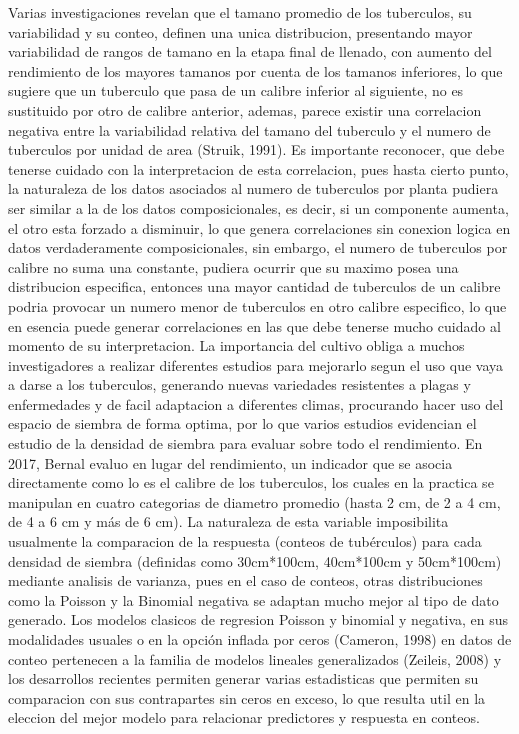 Varias investigaciones revelan que el tamano promedio de los tuberculos, su variabilidad y su conteo, definen una unica distribucion, presentando mayor variabilidad de rangos de tamano en la etapa final de llenado, con aumento del rendimiento de los mayores tamanos por cuenta de los tamanos inferiores, lo que sugiere que un tuberculo que pasa de un calibre inferior al siguiente, no es sustituido por otro de calibre anterior, ademas, parece existir una correlacion negativa entre la variabilidad relativa del tamano del tuberculo y el numero de tuberculos por unidad de area (Struik, 1991). Es importante reconocer, que debe tenerse cuidado con la interpretacion de esta correlacion, pues hasta cierto punto, la naturaleza de los datos asociados al numero de tuberculos por planta pudiera ser similar a la de los datos composicionales, es decir, si un componente aumenta, el otro esta forzado a disminuir, lo que genera correlaciones sin conexion logica en datos verdaderamente composicionales, sin embargo, el numero de tuberculos por calibre no suma una constante, pudiera ocurrir que su maximo posea una distribucion especifica, entonces una mayor cantidad de tuberculos de un calibre podria provocar un numero menor de tuberculos en otro calibre especifico, lo que en esencia puede generar correlaciones en las que debe tenerse mucho cuidado al momento de su interpretacion. La importancia del cultivo obliga a muchos investigadores a realizar diferentes estudios para mejorarlo segun el uso que vaya a darse a los tuberculos, generando nuevas variedades resistentes a plagas y enfermedades y de facil adaptacion a diferentes climas, procurando hacer uso del espacio de siembra de forma optima, por lo que varios estudios evidencian el estudio de la densidad de siembra para evaluar sobre todo el rendimiento. En 2017, Bernal evaluo en lugar del rendimiento, un indicador que se asocia directamente como lo es el calibre de los tuberculos, los cuales en la practica se manipulan en cuatro categorias de diametro promedio (hasta 2 cm, de 2 a 4 cm, de 4 a 6 cm y más de 6 cm). La naturaleza de esta variable imposibilita usualmente la comparacion de la respuesta (conteos de tubérculos) para cada densidad de siembra (definidas como 30cm*100cm, 40cm*100cm y 50cm*100cm) mediante analisis de varianza, pues en el caso de conteos, otras distribuciones como la Poisson y la Binomial negativa se adaptan mucho mejor al tipo de dato generado. Los modelos clasicos de regresion Poisson y binomial y negativa, en sus modalidades usuales o en la opción inflada por ceros (Cameron, 1998) en datos de conteo pertenecen a la familia de modelos lineales generalizados (Zeileis, 2008) y los desarrollos recientes permiten generar varias estadisticas que permiten su comparacion con sus contrapartes sin ceros en exceso, lo que resulta util en la eleccion del mejor modelo para relacionar predictores y respuesta en conteos.\\

